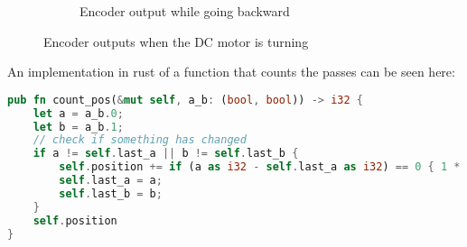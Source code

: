 \begin{center}
\begin{figure}[H]
\begin{subfigure}{.5\textwidth}
            \caption[encoder-backward]{Encoder output while going backward}
            \label{fig:encoder-backward}
        \end{subfigure}
        \caption{Encoder outputs when the DC motor is turning}
        \label{fig:encoder}
    \end{figure}
\end{center}
An implementation in rust of a function that counts the passes can be seen here:
\begin{lstlisting}[language=rust,breaklines,label={lst:dc-motor}]
pub fn count_pos(&mut self, a_b: (bool, bool)) -> i32 {
    let a = a_b.0;
    let b = a_b.1;
    // check if something has changed
    if a != self.last_a || b != self.last_b {
        self.position += if (a as i32 - self.last_a as i32) == 0 { 1 * if a { 1 } else { -1 } * if (b as i32 - self.last_b as i32) == 1 { 1 } else { -1 } } else { - (1 * if b { 1 } else { -1 } * (a as i32 - self.last_a as i32))};
        self.last_a = a;
        self.last_b = b;
    }
    self.position
}

\end{lstlisting}


